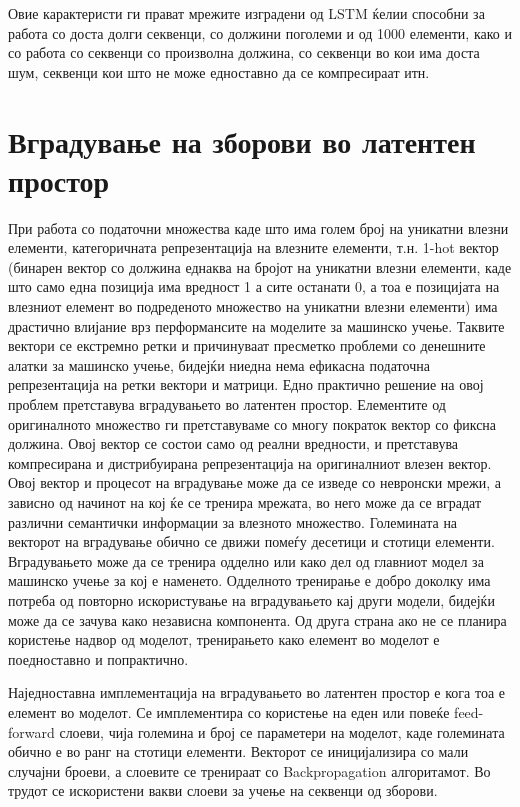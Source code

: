 Овие карактеристи ги прават мрежите изградени од LSTM ќелии способни за работа со доста долги секвенци, со должини поголеми и од 1000 елементи, како и со работа со секвенци со произволна должина, со секвенци во кои има доста шум, секвенци кои што не може едноставно да се компресираат итн.

\section{Вградување на зборови во латентен простор}

При работа со податочни множества каде што има голем број на уникатни влезни елементи, категоричната репрезентација на влезните елементи, т.н. 1-hot вектор (бинарен вектор со должина еднаква на бројот на уникатни влезни елементи, каде што само една позиција има вредност 1 а сите останати 0, а тоа е позицијата на влезниот елемент во подреденото множество на уникатни влезни елементи) има драстично влијание врз перформансите на моделите за машинско учење. Таквите вектори се екстремно ретки и причинуваат пресметко проблеми со денешните алатки за машинско учење, бидејќи ниедна нема ефикасна податочна репрезентација на ретки вектори и матрици. 
Едно практично решение на овој проблем претставува вградувањето во латентен простор. Елементите од оригиналното множество ги претставуваме со многу пократок вектор со фиксна должина. Овој вектор се состои само од реални вредности, и претставува компресирана и дистрибуирана репрезентација на оригиналниот влезен вектор. Овој вектор и процесот на вградување може да се изведе со невронски мрежи, а зависно од начинот на кој ќе се тренира мрежата, во него може да се вградат различни семантички информации за влезното множество. Големината на векторот на вградување обично се движи помеѓу десетици и стотици елементи.
Вградувањето може да се тренира одделно или како дел од главниот модел за машинско учење за кој е наменето. Одделното тренирање е добро доколку има потреба од повторно искористување на вградувањето кај други модели, бидејќи може да се зачува како независна компонента. Од друга страна ако не се планира користење надвор од моделот, тренирањето како елемент во моделот е поедноставно и попрактично.

Наједноставна имплементација на вградувањето во латентен простор е кога тоа е елемент во моделот. Се имплементира со користење на еден или повеќе feed-forward слоеви, чија големина и број се параметери на моделот, каде големината обично е во ранг на стотици елементи. Векторот се иницијализира со мали случајни броеви, а слоевите се тренираат со Backpropagation алгоритамот. Во трудот \cite{Sutskever2014} се искористени вакви слоеви за учење на секвенци од зборови. 

